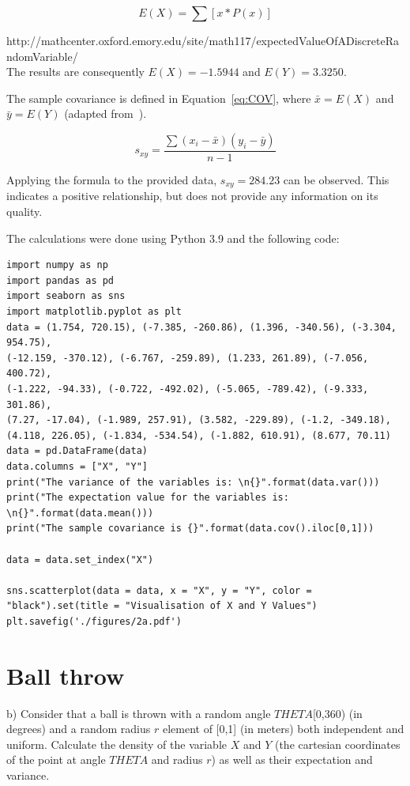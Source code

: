\begin{equation}  E(X) = \sum [x * P(x)]
\label{eq:ExpValDiscrete}
\end{equation}

http://mathcenter.oxford.emory.edu/site/math117/expectedValueOfADiscreteRandomVariable/
\\

The results are consequently $E(X) = -1.5944$ and $E(Y) = 3.3250$.

The sample covariance is defined in Equation~\ref{eq:COV}, where $\bar{x} = E(X)$ and $\bar{y} = E(Y)$ (adapted from~\cite{bruce2017practical}).

\begin{equation}  s_{xy} = \frac{\sum(x_{i}-\bar{x})(y_{i}-\bar{y})}{n-1}
\label{eq:COV}
\end{equation}

Applying the formula to the provided data, $s_{xy} = 284.23$ can be observed. This indicates a positive relationship, but does not provide any information on its quality. 

The calculations were done using Python 3.9 and the following code:

\begin{lstlisting}
import numpy as np
import pandas as pd
import seaborn as sns
import matplotlib.pyplot as plt
data = (1.754, 720.15), (-7.385, -260.86), (1.396, -340.56), (-3.304, 954.75),
(-12.159, -370.12), (-6.767, -259.89), (1.233, 261.89), (-7.056, 400.72), 
(-1.222, -94.33), (-0.722, -492.02), (-5.065, -789.42), (-9.333, 301.86),
(7.27, -17.04), (-1.989, 257.91), (3.582, -229.89), (-1.2, -349.18), 
(4.118, 226.05), (-1.834, -534.54), (-1.882, 610.91), (8.677, 70.11)
data = pd.DataFrame(data)
data.columns = ["X", "Y"]
print("The variance of the variables is: \n{}".format(data.var()))
print("The expectation value for the variables is: \n{}".format(data.mean()))
print("The sample covariance is {}".format(data.cov().iloc[0,1]))

data = data.set_index("X")

sns.scatterplot(data = data, x = "X", y = "Y", color = "black").set(title = "Visualisation of X and Y Values")
plt.savefig('./figures/2a.pdf')
\end{lstlisting}


\section{Ball throw}
b) Consider that a ball is thrown with a random angle $THETA$[0,360) (in degrees) and a random radius $r$ element of [0,1] (in meters) both independent and uniform. Calculate the density of the variable $X$ and $Y$ (the cartesian coordinates of the point at angle $THETA$ and radius $r$) as well as their expectation and variance.

